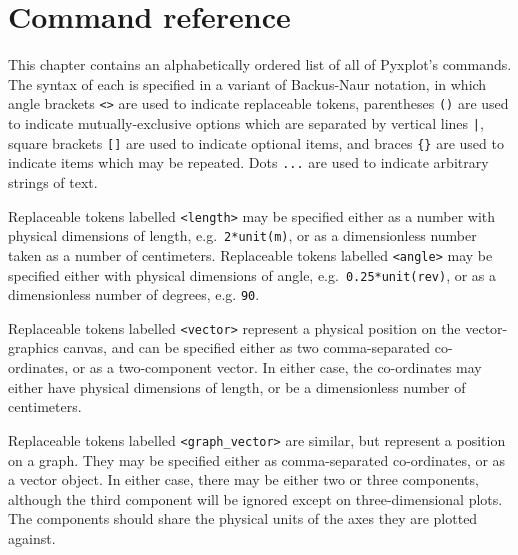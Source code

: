 %
%
%
%
%



\chapter{Command reference}
\label{ch:reference}

This chapter contains an alphabetically ordered list of all of Pyxplot's
commands. The syntax of each is specified in a variant of Backus-Naur notation,
in which angle brackets {\tt <>} are used to indicate replaceable tokens,
parentheses {\tt ()} are used to indicate mutually-exclusive options which are
separated by vertical lines {\tt |}, square brackets {\tt []} are used to
indicate optional items, and braces {\tt \{\}} are used to indicate items which
may be repeated. Dots {\tt ...} are used to indicate arbitrary strings of text.

Replaceable tokens labelled {\tt <length>} may be specified either as a number
with physical dimensions of length, e.g.\ {\tt 2*unit(m)}, or as a
dimensionless number taken as a number of centimeters. Replaceable tokens
labelled {\tt <angle>} may be specified either with physical dimensions of
angle, e.g.\ {\tt 0.25*unit(rev)}, or as a dimensionless number of degrees, e.g.
{\tt 90}.

Replaceable tokens labelled {\tt <vector>} represent a physical position on the
vector-graphics canvas, and can be specified either as two comma-separated
co-ordinates, or as a two-component vector. In either case, the co-ordinates
may either have physical dimensions of length, or be a dimensionless number of
centimeters.

Replaceable tokens labelled {\tt <graph\_vector>} are similar, but represent a
position on a graph. They may be specified either as comma-separated
co-ordinates, or as a vector object. In either case, there may be either two or
three components, although the third component will be ignored except on
three-dimensional plots. The components should share the physical units of the
axes they are plotted against.


